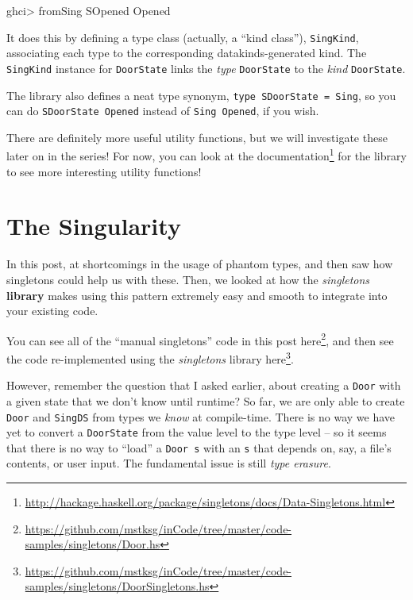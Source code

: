 \documentclass[]{article}
\newenvironment{Shaded}{}{}
\newcommand{\DataTypeTok}[1]{\textcolor[rgb]{0.56,0.13,0.00}{#1}}
\newcommand{\FunctionTok}[1]{\textcolor[rgb]{0.02,0.16,0.49}{#1}}
\newcommand{\NormalTok}[1]{#1}
\renewcommand{\href}[2]{#2\footnote{\url{#1}}}
\begin{document}
\begin{Shaded}
\begin{Highlighting}[]
\NormalTok{ghci}\FunctionTok{>}\NormalTok{ fromSing }\DataTypeTok{SOpened}
\DataTypeTok{Opened}
\end{Highlighting}
\end{Shaded}

It does this by defining a type class (actually, a ``kind class''),
\texttt{SingKind}, associating each type to the corresponding
datakinds-generated kind. The \texttt{SingKind} instance for \texttt{DoorState}
links the \emph{type} \texttt{DoorState} to the \emph{kind} \texttt{DoorState}.

The library also defines a neat type synonym,
\texttt{type\ SDoorState\ =\ Sing}, so you can do
\texttt{SDoorState\ \textquotesingle{}Opened} instead of
\texttt{Sing\ \textquotesingle{}Opened}, if you wish.

There are definitely more useful utility functions, but we will investigate
these later on in the series! For now, you can look at the
\href{http://hackage.haskell.org/package/singletons/docs/Data-Singletons.html}{documentation}
for the library to see more interesting utility functions!

\section{The Singularity}\label{the-singularity}

In this post, at shortcomings in the usage of phantom types, and then saw how
singletons could help us with these. Then, we looked at how the
\emph{singletons} \textbf{library} makes using this pattern extremely easy and
smooth to integrate into your existing code.

You can see all of the ``manual singletons'' code in this post
\href{https://github.com/mstksg/inCode/tree/master/code-samples/singletons/Door.hs}{here},
and then see the code re-implemented using the \emph{singletons} library
\href{https://github.com/mstksg/inCode/tree/master/code-samples/singletons/DoorSingletons.hs}{here}.

However, remember the question that I asked earlier, about creating a
\texttt{Door} with a given state that we don't know until runtime? So far, we
are only able to create \texttt{Door} and \texttt{SingDS} from types we
\emph{know} at compile-time. There is no way we have yet to convert a
\texttt{DoorState} from the value level to the type level -- so it seems that
there is no way to ``load'' a \texttt{Door\ s} with an \texttt{s} that depends
on, say, a file's contents, or user input. The fundamental issue is still
\emph{type erasure}.
\end{document}

